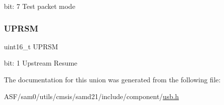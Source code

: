bit\+: 7 Test packet mode \mbox{\label{union_u_s_b___d_e_v_i_c_e___c_t_r_l_b___type_a21d16bc73d976e53f035b7dd20e1160b}} 
\subsubsection{\texorpdfstring{UPRSM}{UPRSM}}
{\footnotesize\ttfamily uint16\+\_\+t U\+P\+R\+SM}

bit\+: 1 Upstream Resume 

The documentation for this union was generated from the following file\+:\begin{DoxyCompactItemize}
\item 
A\+S\+F/sam0/utils/cmsis/samd21/include/component/\mbox{\hyperlink{component_2usb_8h}{usb.\+h}}\end{DoxyCompactItemize}
